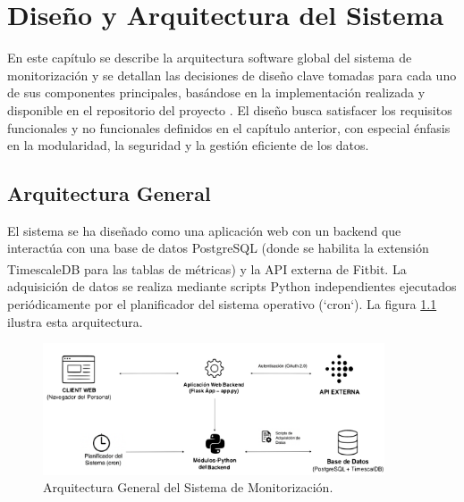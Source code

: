 \chapter{Diseño y Arquitectura del Sistema}
\label{chap:diseno_arquitectura} 

En este capítulo se describe la arquitectura software global del sistema de monitorización y se detallan las decisiones de diseño clave tomadas para cada uno de sus componentes principales, basándose en la implementación realizada y disponible en el repositorio del proyecto \cite{github_repo_proyecto}. El diseño busca satisfacer los requisitos funcionales y no funcionales definidos en el capítulo anterior, con especial énfasis en la modularidad, la seguridad y la gestión eficiente de los datos.

\section{Arquitectura General}
\label{sec:arquitectura_general}

El sistema se ha diseñado como una aplicación web con un backend que interactúa con una base de datos PostgreSQL (donde se habilita la extensión TimescaleDB para las tablas de métricas) y la API externa de Fitbit\textsuperscript{\textregistered}. La adquisición de datos se realiza mediante scripts Python independientes ejecutados periódicamente por el planificador del sistema operativo (`cron`). La figura \ref{fig:arquitectura_general} ilustra esta arquitectura.


 \begin{figure}[htbp] 
    \centering
    \includegraphics[width=0.9\textwidth]{imagenes/arquitectura_general.png}
    \caption{Arquitectura General del Sistema de Monitorización.}
    \label{fig:arquitectura_general}
 \end{figure}

